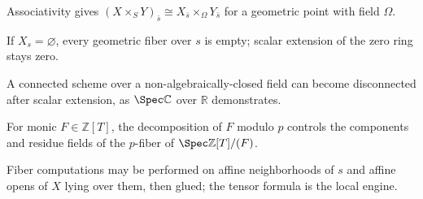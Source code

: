 \begin{example}\label{ex:vi25-a10}
Associativity gives $(X\times_SY)_{\bar s}\cong X_{\bar s}\times_{\Omega}Y_{\bar s}$ for a geometric point with field $\Omega$.
\end{example}
\begin{example}\label{ex:vi25-a11}
If $X_s=\varnothing$, every geometric fiber over $s$ is empty; scalar extension of the zero ring stays zero.
\end{example}
\begin{example}\label{ex:vi25-a12}
A connected scheme over a non-algebraically-closed field can become disconnected after scalar extension, as $\Spec\mathbb C$ over $\mathbb R$ demonstrates.
\end{example}
\begin{example}\label{ex:vi25-a13}
For monic $F\in\mathbb Z[T]$, the decomposition of $F$ modulo $p$ controls the components and residue fields of the $p$-fiber of $\Spec\mathbb Z[T]/(F)$.
\end{example}
\begin{example}\label{ex:vi25-a14}
Fiber computations may be performed on affine neighborhoods of $s$ and affine opens of $X$ lying over them, then glued; the tensor formula is the local engine.
\end{example}
